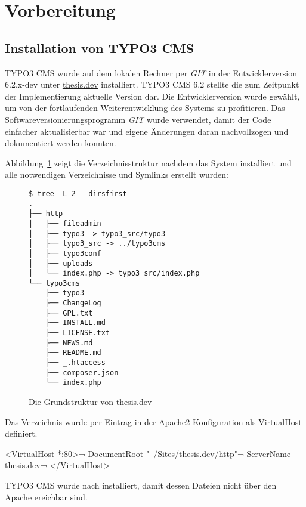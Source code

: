 \section{Vorbereitung}
\label{prototype:sec:preparation}

\subsection{Installation von TYPO3 CMS}
\label{prototype:subsec:installTYPO3}
TYPO3 CMS wurde auf dem lokalen Rechner per \textit{GIT} in der Entwicklerversion 6.2.x-dev unter \url{thesis.dev} installiert. TYPO3 CMS 6.2 stellte die zum Zeitpunkt der Implementierung aktuelle Version dar. Die Entwicklerversion wurde gewählt, um von der fortlaufenden Weiterentwicklung des Systems zu profitieren. Das Softwareversionierungsprogramm \textit{GIT} wurde verwendet, damit der Code einfacher aktualisierbar war und eigene Änderungen daran nachvollzogen und dokumentiert werden konnten.

Abbildung~\ref{lst:thesisDevFolders} zeigt die Verzeichnisstruktur nachdem das System installiert und alle notwendigen Verzeichnisse und Symlinks erstellt wurden:

\begin{figure}[H]
\begin{Verbatim}[samepage=true]
$ tree -L 2 --dirsfirst
.
├── http
│   ├── fileadmin
│   ├── typo3 -> typo3_src/typo3
│   ├── typo3_src -> ../typo3cms
│   ├── typo3conf
│   ├── uploads
│   └── index.php -> typo3_src/index.php
└── typo3cms
    ├── typo3
    ├── ChangeLog
    ├── GPL.txt
    ├── INSTALL.md
    ├── LICENSE.txt
    ├── NEWS.md
    ├── README.md
    ├── _.htaccess
    ├── composer.json
    └── index.php
\end{Verbatim}
\caption{Die Grundstruktur von \url{thesis.dev}}
\label{lst:thesisDevFolders}
\end{figure}

Das Verzeichnis  wurde per Eintrag in der Apache2 Konfiguration als VirtualHost definiert.

\begin{shcode}
<VirtualHost *:80>¬
DocumentRoot "~/Sites/thesis.dev/http"¬
ServerName thesis.dev¬
</VirtualHost>
\end{shcode}

TYPO3 CMS wurde nach  installiert, damit dessen Dateien nicht über den Apache ereichbar sind.

